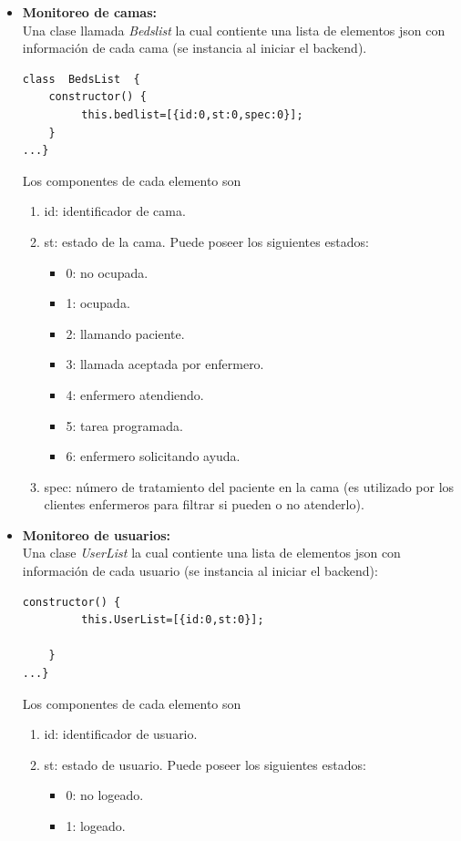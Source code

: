 \begin{itemize}

\item \textbf{ Monitoreo de camas:}\\
Una  clase llamada \textit{Bedslist} la cual contiente una lista de elementos json con información de cada cama (se instancia al iniciar el backend).

\begin{lstlisting}[caption=  Clase Bedlist]
class  BedsList  {    
    constructor() {
         this.bedlist=[{id:0,st:0,spec:0}];                        
    }
...}
\end{lstlisting}

Los componentes de cada elemento son 
\begin{enumerate}
\item id: identificador de cama.
\item st: estado de la cama. Puede poseer los siguientes estados: 
\begin{itemize}
\item 0: no ocupada.
\item 1: ocupada.
\item 2: llamando paciente.
\item 3: llamada aceptada por enfermero.
\item 4: enfermero atendiendo.
\item 5: tarea programada.
\item 6: enfermero solicitando ayuda.
\end{itemize}
\item spec: número de tratamiento del paciente en la cama (es utilizado por los clientes enfermeros para filtrar si pueden o no atenderlo).
\end{enumerate}

\item \textbf{ Monitoreo de usuarios:}\\
Una clase \textit{UserList} la cual contiente una lista de elementos json con información de cada usuario (se instancia al iniciar el backend):

\begin{lstlisting}[caption=  Clase Userlist]
constructor() {
         this.UserList=[{id:0,st:0}];                
        
    }
...}
\end{lstlisting}

Los componentes de cada elemento son 
	\begin{enumerate}
		\item id: identificador de usuario.
		\item st: estado de usuario. Puede poseer los siguientes estados: 
			\begin{itemize}
				\item 0: no logeado.
				\item 1: logeado.
			\end{itemize}
	\end{enumerate}





\end{itemize}
